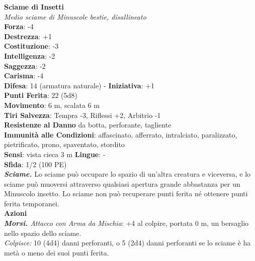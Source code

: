\begin{multicols}{2}
\medskip\textbf{Sciame di Insetti}\\
\emph{Medio sciame di Minuscole bestie, disallineato}\\
\textbf{Forza}: -4\\
\textbf{Destrezza}: +1\\
\textbf{Costituzione}: -3\\
\textbf{Intelligenza}: -2\\
\textbf{Saggezza}: -2\\
\textbf{Carisma}: -4\\
\textbf{Difesa}: 14 (armatura naturale) - \textbf{Iniziativa}: +1\\
\textbf{Punti Ferita}: 22 (5d8)\\
\textbf{Movimento}: 6 m, scalata 6 m\\
\textbf{Tiri Salvezza}: Tempra -3, Riflessi +2, Arbitrio -1\\
\textbf{Resistenze al Danno} da botta, perforante, tagliente\\
\textbf{Immunità alle Condizioni}: affascinato, afferrato, intralciato, paralizzato, pietrificato, prono, spaventato, stordito\\
\textbf{Sensi}: vista cieca 3 m
\textbf{Lingue}: -\\
\textbf{Sfida}: 1/2 (100 PE)\smallskip\\
\emph{\textbf{Sciame.}} Lo sciame può occupare lo spazio di un'altra creatura e viceversa, e lo sciame può muoversi attraverso qualsiasi apertura grande abbastanza per un Minuscolo insetto. Lo sciame non può recuperare punti ferita né ottenere punti ferita temporanei.\\
\smallskip\textbf{Azioni}\\
\emph{\textbf{Morsi.} Attacco con Arma da Mischia}: +4 al colpire, portata 0 m, un bersaglio nello spazio dello sciame.\\
\emph{Colpisce:} 10 (4d4) danni perforanti, o 5 (2d4) danni perforanti se lo sciame è ha metà o meno dei suoi punti ferita.\\


\end{multicols}
